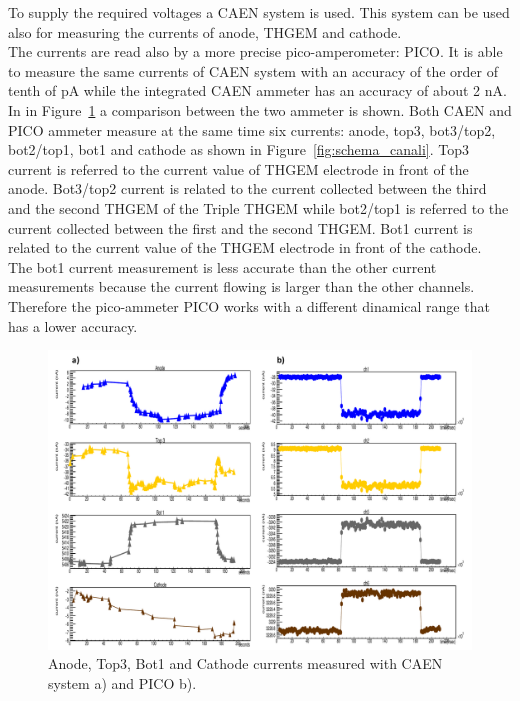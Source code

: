 \documentclass[a4paper, 11 pt]{article}
\begin{document}
To supply the required voltages a CAEN system is used. This system can be used also for measuring 
the currents of anode, THGEM and cathode.\\
The currents are read also by a more precise pico-amperometer: PICO.
It is able to measure the same currents of CAEN system with an accuracy of the order of tenth of pA
while the integrated CAEN ammeter has an accuracy of about 2 nA.
In in Figure~\ref{fig:run190_CAEN_pico} a comparison between the two ammeter is shown.  Both CAEN and PICO 
ammeter measure at the same time six currents: anode, top3, bot3/top2, bot2/top1, bot1 and cathode as shown in Figure~\ref{fig:schema_canali}. Top3 current is referred to the current value of THGEM electrode in front of the anode. Bot3/top2 current is related to the current collected between the third and the second THGEM of the Triple THGEM while bot2/top1 is referred to the current collected between the first and the second THGEM. Bot1 current is related to the current value of the THGEM electrode in front of the cathode.\\
The bot1 current measurement is less accurate than the other current measurements because the 
current flowing is larger than the other channels. Therefore the pico-ammeter PICO works with
a different dinamical range that has a lower accuracy.
\begin{figure}
	\centering
	\includegraphics[width=1\textwidth]{Immagini/run190_CAEN_pico.pdf}
	\caption{Anode, Top3, Bot1 and Cathode currents measured with CAEN system a) and PICO b).}
	\label{fig:run190_CAEN_pico}
\end{figure}
\end{document}
